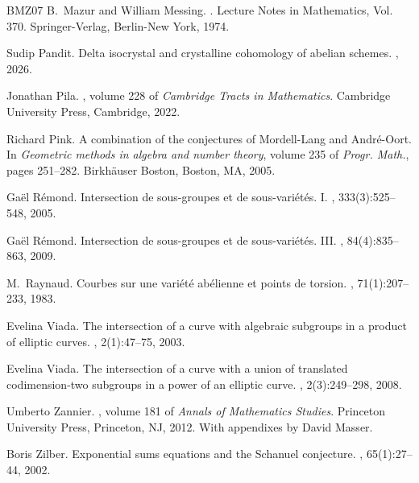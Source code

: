 \documentclass[11pt]{amsart}
\theoremstyle{plain}
\theoremstyle{definition}
\begin{document}
\begin{thebibliography}{BMZ07}
B.~Mazur and William Messing.
.
\newblock Lecture Notes in Mathematics, Vol. 370. Springer-Verlag, Berlin-New York, 1974.

Sudip Pandit.
\newblock Delta isocrystal and crystalline cohomology of abelian schemes.
, 2026.

Jonathan Pila.
, volume 228 of {\em Cambridge Tracts in Mathematics}.
\newblock Cambridge University Press, Cambridge, 2022.

Richard Pink.
\newblock A combination of the conjectures of {M}ordell-{L}ang and {A}ndr\'{e}-{O}ort.
\newblock In {\em Geometric methods in algebra and number theory}, volume 235 of {\em Progr. Math.}, pages 251--282. Birkh\"{a}user Boston, Boston, MA, 2005.

Ga\"{e}l R\'{e}mond.
\newblock Intersection de sous-groupes et de sous-vari\'{e}t\'{e}s. {I}.
, 333(3):525--548, 2005.

Ga\"{e}l R\'{e}mond.
\newblock Intersection de sous-groupes et de sous-vari\'{e}t\'{e}s. {III}.
, 84(4):835--863, 2009.

M.~Raynaud.
\newblock Courbes sur une vari\'{e}t\'{e} ab\'{e}lienne et points de torsion.
, 71(1):207--233, 1983.

Evelina Viada.
\newblock The intersection of a curve with algebraic subgroups in a product of elliptic curves.
, 2(1):47--75, 2003.

Evelina Viada.
\newblock The intersection of a curve with a union of translated codimension-two subgroups in a power of an elliptic curve.
, 2(3):249--298, 2008.

Umberto Zannier.
, volume 181 of {\em Annals of Mathematics Studies}.
\newblock Princeton University Press, Princeton, NJ, 2012.
\newblock With appendixes by David Masser.

Boris Zilber.
\newblock Exponential sums equations and the {S}chanuel conjecture.
, 65(1):27--44, 2002.

\end{thebibliography}
\end{document}
